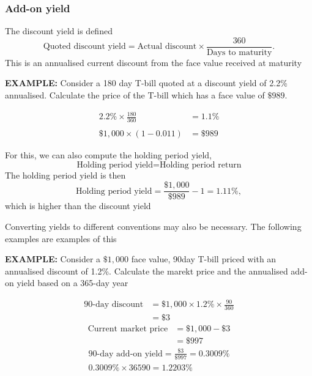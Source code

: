 \documentclass[../notes_compiled.tex]{subfiles}
\begin{document}
\subsubsection{Add-on yield}
\begin{itemize}
\item The discount yield is defined
\begin{equation}
\text{Quoted discount yield}=\text{Actual discount}\times\frac{360}{\text{Days to maturity}}.
\end{equation}
This is an annualised current discount from the face value received at maturity

{\color{RedViolet}
\item[] \textbf{EXAMPLE:} Consider a 180 day T-bill quoted at a discount yield of 2.2\% annualised. Calculate the price of the T-bill which has a face value of $\$989$.
}
{\color{RoyalBlue}

\begin{align*}
2.2\% \times \frac{180}{360} &=1.1\% \\ \\
\$1,000 \times (1-0.011) &= \$989
\end{align*}

}

For this, we can also compute the holding period yield,
\begin{equation}
\text{Holding period yield} = \text{Holding period return}
\end{equation}
{\color{RoyalBlue}
The holding period yield is then
\begin{equation*}
\text{Holding period yield} = \frac{\$1,000}{\$989}-1 = 1.11\%,
\end{equation*}
which is higher than the discount yield
}

\item Converting yields to different conventions may also be necessary. The following examples are examples of this

{\color{RedViolet}
\item[] \textbf{EXAMPLE:} Consider a $\$1,000$ face value, 90day T-bill priced with an annualised discount of 1.2\%. Calculate the marekt price and the annualised add-on yield based on a 365-day year
}
{\color{RoyalBlue}
\begin{align*}
\text{90-day discount}&=\$1,000 \times 1.2\% \times \frac{90}{360} \\
&=\$3
\end{align*}
\begin{align*}
\text{Current market price} &= \$1,000-\$3 \\
&=\$997
\end{align*}
\begin{gather*}
\text{90-day add-on yield}=\frac{\$3}{\$997} = 0.3009\% \\
0.3009\%\times{365}{90}=1.2203\%
\end{gather*}
}


\end{itemize}
\end{document}

